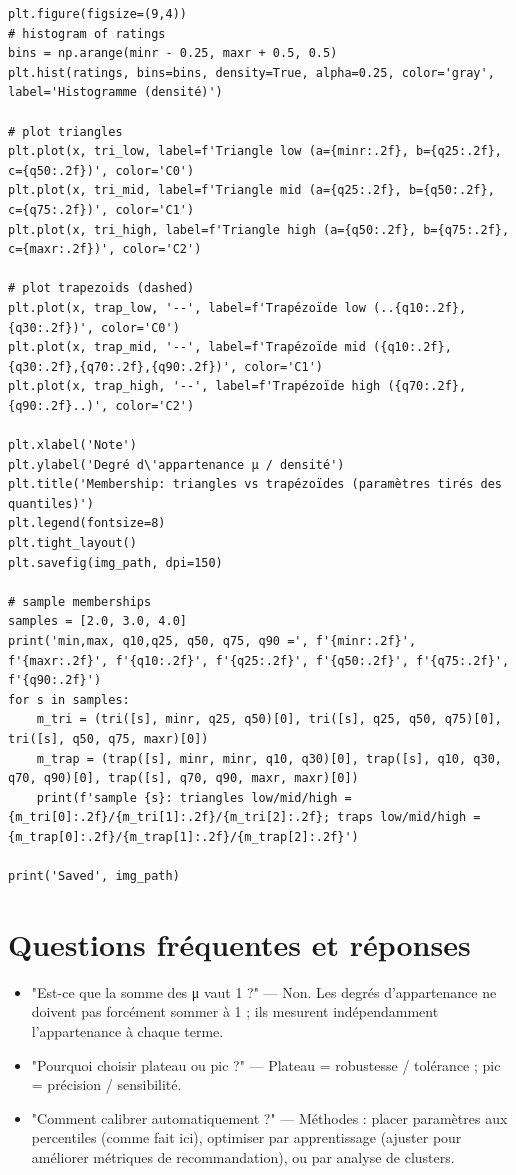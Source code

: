 \documentclass[a4paper,11pt]{article}
\begin{document}
\begin{lstlisting}
plt.figure(figsize=(9,4))
# histogram of ratings
bins = np.arange(minr - 0.25, maxr + 0.5, 0.5)
plt.hist(ratings, bins=bins, density=True, alpha=0.25, color='gray', label='Histogramme (densité)')

# plot triangles
plt.plot(x, tri_low, label=f'Triangle low (a={minr:.2f}, b={q25:.2f}, c={q50:.2f})', color='C0')
plt.plot(x, tri_mid, label=f'Triangle mid (a={q25:.2f}, b={q50:.2f}, c={q75:.2f})', color='C1')
plt.plot(x, tri_high, label=f'Triangle high (a={q50:.2f}, b={q75:.2f}, c={maxr:.2f})', color='C2')

# plot trapezoids (dashed)
plt.plot(x, trap_low, '--', label=f'Trapézoïde low (..{q10:.2f},{q30:.2f})', color='C0')
plt.plot(x, trap_mid, '--', label=f'Trapézoïde mid ({q10:.2f},{q30:.2f},{q70:.2f},{q90:.2f})', color='C1')
plt.plot(x, trap_high, '--', label=f'Trapézoïde high ({q70:.2f},{q90:.2f}..)', color='C2')

plt.xlabel('Note')
plt.ylabel('Degré d\'appartenance μ / densité')
plt.title('Membership: triangles vs trapézoïdes (paramètres tirés des quantiles)')
plt.legend(fontsize=8)
plt.tight_layout()
plt.savefig(img_path, dpi=150)

# sample memberships
samples = [2.0, 3.0, 4.0]
print('min,max, q10,q25, q50, q75, q90 =', f'{minr:.2f}', f'{maxr:.2f}', f'{q10:.2f}', f'{q25:.2f}', f'{q50:.2f}', f'{q75:.2f}', f'{q90:.2f}')
for s in samples:
    m_tri = (tri([s], minr, q25, q50)[0], tri([s], q25, q50, q75)[0], tri([s], q50, q75, maxr)[0])
    m_trap = (trap([s], minr, minr, q10, q30)[0], trap([s], q10, q30, q70, q90)[0], trap([s], q70, q90, maxr, maxr)[0])
    print(f'sample {s}: triangles low/mid/high = {m_tri[0]:.2f}/{m_tri[1]:.2f}/{m_tri[2]:.2f}; traps low/mid/high = {m_trap[0]:.2f}/{m_trap[1]:.2f}/{m_trap[2]:.2f}')

print('Saved', img_path)
\end{lstlisting}

\section{Questions fréquentes et réponses}
\begin{itemize}
  \item "Est-ce que la somme des μ vaut 1 ?" — Non. Les degrés d'appartenance ne doivent pas forcément sommer à 1 ; ils mesurent indépendamment l'appartenance à chaque terme.
  \item "Pourquoi choisir plateau ou pic ?" — Plateau = robustesse / tolérance ; pic = précision / sensibilité.
  \item "Comment calibrer automatiquement ?" — Méthodes : placer paramètres aux percentiles (comme fait ici), optimiser par apprentissage (ajuster pour améliorer métriques de recommandation), ou par analyse de clusters.
\end{itemize}
\end{document}
